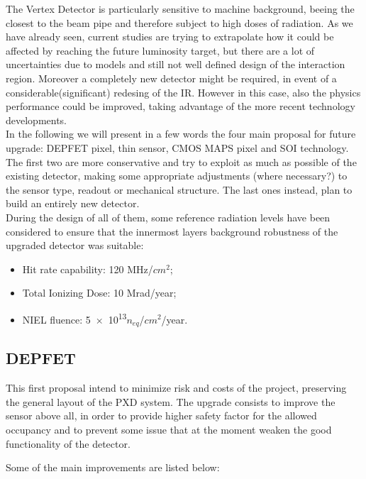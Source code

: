 The Vertex Detector is particularly sensitive to machine background, beeing the closest to the beam pipe and therefore subject to high doses of radiation.
As we have already seen, current studies are trying to extrapolate how it could be affected by reaching the future luminosity target, but there are a lot of uncertainties due to models and still not well defined design of the interaction region. Moreover a completely new detector might be required, in event of a considerable(significant) redesing of the IR. However in this case, also the physics performance could be improved, taking advantage of the more recent technology developments.\\

In the following we will present in a few words the four main proposal for future upgrade: DEPFET pixel, thin sensor, CMOS MAPS pixel and SOI technology.
The first two are more conservative and try to exploit as much as possible of the existing detector, making some appropriate adjustments (where necessary?) to the sensor type, readout or mechanical structure. The last ones instead, plan to build an entirely new detector.\\

During the design of all of them, some reference radiation levels have been considered to ensure that the innermost layers background robustness of the upgraded detector was suitable:

\begin{itemize}
\item Hit rate capability: 120 MHz/$cm^{2}$;
\item Total Ionizing Dose: 10 Mrad/year;
\item NIEL fluence: \num{5e13}$n_{eq}$/$cm^{2}$/year.
\end{itemize}



\subsection{DEPFET}

This first proposal intend to minimize risk and costs of the project, preserving the general layout of the PXD system. The upgrade consists to improve the sensor above all, in order to provide higher safety factor for the allowed occupancy and to prevent some issue that at the moment weaken the good functionality of the detector.

Some of the main improvements are listed below:

